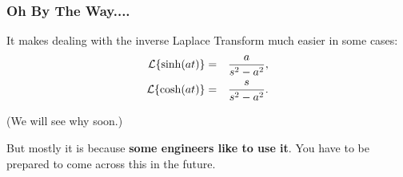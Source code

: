 \begin{frame}
  \frametitle{Oh By The Way....}

  It makes dealing with the inverse Laplace Transform much easier in some cases:
  \begin{eqnarray*}
    \laplace{\sinh(at)} & = & \frac{a}{s^2-a^2}, \\
    \laplace{\cosh(at)} & = & \frac{s}{s^2-a^2}.
  \end{eqnarray*}

  (We will see why soon.)

  But mostly it is because \textbf{some engineers like to use it}. You
  have to be prepared to come across this in the future.
  
\end{frame}



